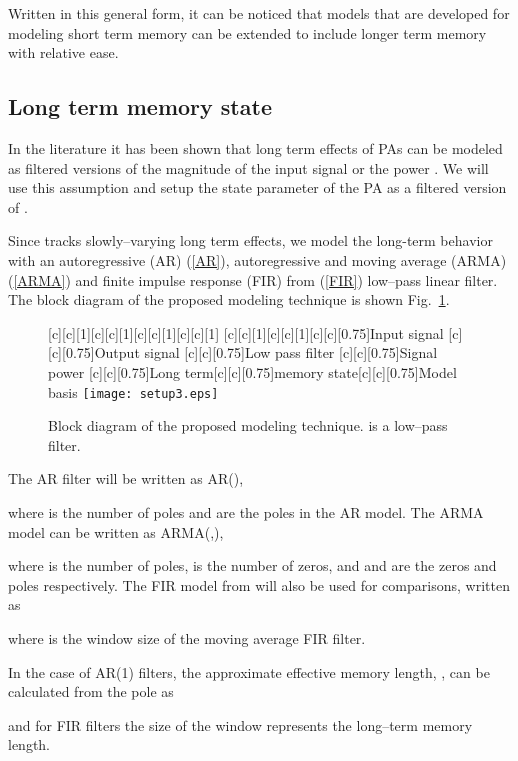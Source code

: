 \documentclass[journal]{IEEEtran}
\begin{document}
Written in this general form, it can be noticed that models that are developed for modeling short term memory can be extended to include longer term memory with relative ease.

\subsection{Long term memory state}
In the literature it has been shown that long term effects of PAs can be modeled as filtered versions of the magnitude of the input signal  or the power  \cite{ngoya,crespo2011,ngoya2009}. We will use this assumption and setup the state parameter  of the PA as a filtered version of .

Since  tracks slowly--varying long term effects, we model the long-term behavior with an autoregressive (AR) (\ref{AR}), autoregressive and moving average (ARMA) (\ref{ARMA}) and finite impulse response (FIR) from \cite{soltani2012} (\ref{FIR}) low--pass linear filter. The block diagram of the proposed modeling technique is shown Fig.~\ref{setup1}.
\begin{figure}
\centering
{}[c][c][1]{}[c][c][1]{}[c][c][1]{}[c][c][1]{}
[c][c][1]{}[c][c][1]{}[c][c][0.75]{Input signal} [c][c][0.75]{Output signal} [c][c][0.75]{Low pass filter} [c][c][0.75]{Signal power} [c][c][0.75]{Long term}[c][c][0.75]{memory state}[c][c][0.75]{Model basis}
\texttt{[image: setup3.eps]}
\caption{Block diagram of the proposed modeling technique.  is a low--pass filter.} \label{setup1}
\end{figure}

The AR filter will be written as AR(),

where  is the number of poles and  are the poles in the AR model. The ARMA model can be written as ARMA(,),

where  is the number of poles,  is the number of zeros, and  and  are the zeros and poles respectively. The FIR model from \cite{soltani2012} will also be used for comparisons, written as

where  is the window size of the moving average FIR filter.

In the case of AR(1) filters, the approximate effective memory length, , can be calculated from the pole as

and for FIR filters the size of the window  represents the long--term memory length.
\end{document}
